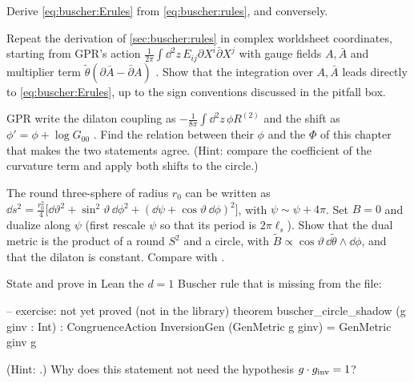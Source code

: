 \begin{exercise}[$\star$]\label{exr:buscher:Eform}
Derive \eqref{eq:buscher:Erules} from \eqref{eq:buscher:rules}, and conversely.
\end{exercise}

\begin{exercise}[$\star\star$]\label{exr:buscher:complex}
Repeat the derivation of \cref{sec:buscher:rules} in complex worldsheet coordinates, starting
from GPR's action $\frac{1}{2\pi}\int\dd^2z\,E_{ij}\partial X^i\bar\partial X^j$ with gauge
fields $A,\bar A$ and multiplier term $\tilde\theta(\partial\bar A-\bar\partial A)$
. Show that the integration over $A,\bar A$ leads directly
to \eqref{eq:buscher:Erules}, up to the sign conventions discussed in the pitfall box.
\end{exercise}

\begin{exercise}[$\star\star$]\label{exr:buscher:gprdilaton}
GPR write the dilaton coupling as $-\frac{1}{8\pi}\int\dd^2z\,\phi R^{(2)}$ and the shift as
$\phi'=\phi+\log G_{00}$ . Find the relation
between their $\phi$ and the $\Phi$ of this chapter that makes the two statements agree.
(Hint: compare the coefficient of the curvature term and apply both shifts to the circle.)
\end{exercise}

\begin{exercise}[$\star\star$]\label{exr:buscher:hopf}
The round three-sphere of radius $r_0$ can be written as
$\dd s^2=\frac{r_0^2}{4}\big[\dd\vartheta^2+\sin^2\!\vartheta\,\dd\phi^2
+(\dd\psi+\cos\vartheta\,\dd\phi)^2\big]$, with $\psi\sim\psi+4\pi$. Set $B=0$ and dualize
along $\psi$ (first rescale $\psi$ so that its period is $2\pi\ell_s$). Show that the dual
metric is the product of a round $S^2$ and a circle, with
$\tilde B\propto\cos\vartheta\,\dd\tilde\theta\wedge\dd\phi$, and that the dilaton is
constant. Compare with .
\end{exercise}

\begin{exercise}\label{exr:buscher:leangeneral}
State and prove in Lean the $d=1$ Buscher rule that is missing from the file:
\begin{leancode}
-- exercise: not yet proved (not in the library)
theorem buscher_circle_shadow (g ginv : Int) :
    CongruenceAction InversionGen (GenMetric g ginv) = GenMetric ginv g
\end{leancode}
(Hint: .) Why
does this statement not need the hypothesis $g\cdot g_{\rm inv}=1$?
\end{exercise}

